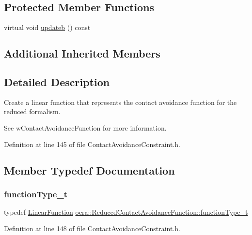 \subsection*{Protected Member Functions}
\begin{DoxyCompactItemize}
\item 
virtual void \hyperlink{classocra_1_1ReducedContactAvoidanceFunction_ac39227a19a650de28f4ae603511bfb73}{updateb} () const
\end{DoxyCompactItemize}
\subsection*{Additional Inherited Members}


\subsection{Detailed Description}
Create a linear function that represents the contact avoidance function for the reduced formalism. 

See w\+Contact\+Avoidance\+Function for more information. 

Definition at line 145 of file Contact\+Avoidance\+Constraint.\+h.



\subsection{Member Typedef Documentation}
\hypertarget{classocra_1_1ReducedContactAvoidanceFunction_ae1d0c9b1c213515eabdb15cb7dc82869}{}\label{classocra_1_1ReducedContactAvoidanceFunction_ae1d0c9b1c213515eabdb15cb7dc82869} 
\subsubsection{\texorpdfstring{function\+Type\+\_\+t}{functionType\_t}}
{\footnotesize\ttfamily typedef \hyperlink{classocra_1_1LinearFunction}{Linear\+Function} \hyperlink{classocra_1_1ReducedContactAvoidanceFunction_ae1d0c9b1c213515eabdb15cb7dc82869}{ocra\+::\+Reduced\+Contact\+Avoidance\+Function\+::function\+Type\+\_\+t}}



Definition at line 148 of file Contact\+Avoidance\+Constraint.\+h.



